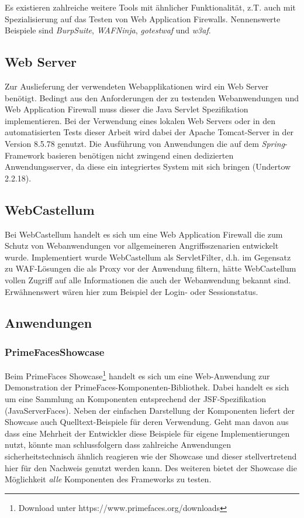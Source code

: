 Es existieren zahlreiche weitere Tools mit ähnlicher Funktionalität, z.T. auch mit Spezialisierung auf das Testen von Web Application Firewalls. Nennenswerte Beispiele sind \emph{BurpSuite}, \emph{WAFNinja}, \emph{gotestwaf} und \emph{w3af}.  

\subsection{Web Server}

Zur Auslieferung der verwendeten Webapplikationen wird ein Web Server benötigt. Bedingt aus den Anforderungen der zu testenden Webanwendungen und Web Application Firewall muss dieser die Java Servlet Spezifikation implementieren. Bei der Verwendung eines lokalen Web Servers oder in den automatisierten Tests dieser Arbeit wird dabei der Apache Tomcat-Server in der Version 8.5.78 genutzt. Die Ausführung von Anwendungen die auf dem \emph{Spring}-Framework basieren benötigen nicht zwingend einen dedizierten Anwendungsserver, da diese ein integriertes System mit sich bringen (Undertow 2.2.18).

\subsection{WebCastellum}
Bei WebCastellum handelt es sich um eine Web Application Firewall die zum Schutz von Webanwendungen vor allgemeineren Angriffsszenarien entwickelt wurde. Implementiert wurde WebCastellum als ServletFilter, d.h. im Gegensatz zu WAF-Lösungen die als Proxy vor der Anwendung filtern, hätte WebCastellum vollen Zugriff auf alle Informationen die auch der Webanwendung bekannt sind. Erwähnenswert wären hier zum Beispiel der Login- oder Sessionstatus. 


\subsection{Anwendungen}

\subsubsection{PrimeFacesShowcase}

Beim PrimeFaces Showcase\footnote{Download unter https://www.primefaces.org/downloads} handelt es sich um eine Web-Anwendung zur Demonstration der PrimeFaces-Komponenten-Bibliothek. Dabei handelt es sich um eine Sammlung an Komponenten entsprechend der JSF-Spezifikation (JavaServerFaces). Neben der einfachen Darstellung der Komponenten liefert der Showcase auch Quelltext-Beispiele für deren Verwendung. Geht man davon aus dass eine Mehrheit der Entwickler diese Beispiele für eigene Implementierungen nutzt, könnte man schlussfolgern dass zahlreiche Anwendungen sicherheitstechnisch ähnlich reagieren wie der Showcase und dieser stellvertretend hier für den Nachweis genutzt werden kann. Des weiteren bietet der Showcase die Möglichkeit \emph{alle} Komponenten des Frameworks zu testen.

